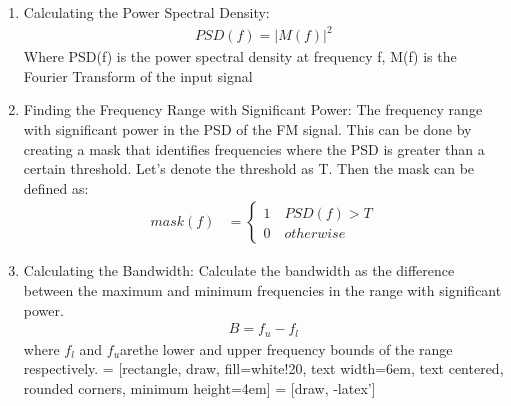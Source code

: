 \documentclass[journal,5pt,twocolumn]{IEEEtran}
\begin{document}
\begin{enumerate}
\item Calculating the Power Spectral Density:
\begin{align*}
PSD(f)=\lvert M(f) \rvert^2 
\end{align*}
Where PSD(f) is the power spectral density at frequency f, M(f) is the Fourier Transform of the input signal

\item Finding the Frequency Range with Significant Power:
The frequency range with significant power in the PSD of the FM signal. This can be done by creating a mask that identifies frequencies where the PSD is greater than a certain threshold. Let's denote the threshold as T. Then the mask can be defined as:
\begin{align*}
mask(f) &=
\begin{cases}
 1 \quad PSD(f) > T\\
0 \quad otherwise
\end{cases}
\end{align*}

\item Calculating the Bandwidth: Calculate the bandwidth as the difference between the maximum and minimum frequencies in the range with significant power.
\begin{align*}
B = f_u - f_l
\end{align*}
where $f_l $ and $f_u $arethe lower and upper frequency bounds of the range  respectively.
 = [rectangle, draw, fill=white!20, text width=6em, text centered, rounded corners, minimum height=4em]
 = [draw, -latex']

\end{enumerate}
\end{document}

